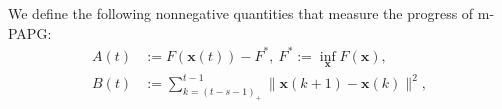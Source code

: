 \documentclass[leqno,onefignum,onetabnum]{siamart0516}
\newcommand{\xb}{\mathbf{x}}
\newcommand{\prox}[2][\eta]{\mathrm{prox}_{#2}^{#1}}
\newcommand{\mspg}{\textsf{m-PAPG}\xspace}
\begin{document}
We define the following nonnegative quantities that measure the progress of \mspg:
\begin{align}
A(t) &:= F(\xb(t)) - F^*, ~ F^* :=\inf_{\xb} F(\xb), \\
B(t) &:= \sum_{k=(t-s-1)_+}^{t-1} \|\xb(k+1) - \xb(k)\|^2, 
\end{align}
%
%
\end{document}
